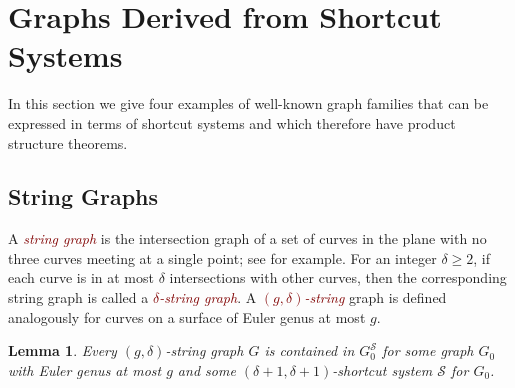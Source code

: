 \documentclass{patmorin}
\theoremstyle{plain}
\newtheorem{lem}[thm]{Lemma}
\theoremstyle{definition}
\newcommand{\defin}[1]{\textcolor{Maroon}{\emph{#1}}}
\newcommand{\note}[2]{\noindent{\color{red}[#1:~#2]}}
\newcommand{\referee}[2]{\noindent\textcolor{blue}{\framebox{\begin{minipage}{\textwidth} Ref \#{#1}: #2\end{minipage}}}}
\renewcommand{\SS}{\mathcal{S}}
\renewcommand{\geq}{\geqslant}
\begin{document}
%





\section{Graphs Derived from Shortcut Systems}
\label{examples}

In this section we give four examples of well-known graph families that can be expressed in terms of shortcut systems and which therefore have product structure theorems.


\subsection{String Graphs}
\label{first_example}

A \defin{string graph} is the intersection graph of a set of curves in the plane with no three curves meeting at a single point; see  \cite{PachToth-DCG02,FP10,FP14} for example. For an integer $\delta\geq 2$, if each curve is in at most $\delta$ intersections with other curves, then the corresponding string graph is called a \defin{$\delta$-string graph}. A \defin{$(g,\delta)$-string} graph is defined analogously for curves on a surface of Euler genus at most $g$.

\begin{lem}
\label{StringShortcut}
Every $(g,\delta)$-string graph $G$ is contained in $G_0^\SS$ for some graph $G_0$ with Euler genus at most $g$ and some $(\delta+1,\delta+1 )$-shortcut system $\SS$ for $G_0$.
\end{lem}
\end{document}
